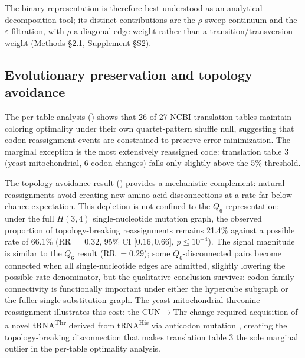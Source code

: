 \documentclass[preprint,11pt,authoryear,a4paper]{elsarticle}
\begin{document}
The binary representation is therefore best understood as an analytical
decomposition tool; its distinct contributions are the \(\rho\)-sweep
continuum and the \(\varepsilon\)-filtration, with \(\rho\) a
diagonal-edge weight rather than a transition/transversion weight
(Methods §2.1, Supplement §S2).

\subsection{Evolutionary preservation and topology
avoidance}\label{sec:disc-evol}

The per-table analysis () shows that 26 of 27 NCBI
translation tables maintain coloring optimality under their own
quartet-pattern shuffle null, suggesting that codon reassignment events
are constrained to preserve error-minimization. The marginal exception
is the most extensively reassigned code: translation table 3 (yeast
mitochondrial, 6 codon changes) falls only slightly above the 5\%
threshold.

The topology avoidance result () provides a mechanistic
complement: natural reassignments avoid creating new amino acid
disconnections at a rate far below chance expectation. This depletion is
not confined to the \(Q_{6}\) representation: under the full \(H(3,4)\)
single-nucleotide mutation graph, the observed proportion of
topology-breaking reassignments remains 21.4\% against a possible rate
of 66.1\% (\(\text{RR } = 0.32\), 95\% CI \(\lbrack 0.16,0.66\rbrack\),
\(p \leq 10^{- 4}\)). The signal magnitude is similar to the \(Q_{6}\)
result (\(\text{RR } = 0.29\)); some \(Q_{6}\)-disconnected pairs become
connected when all single-nucleotide edges are admitted, slightly
lowering the possible-rate denominator, but the qualitative conclusion
survives: codon-family connectivity is functionally important under
either the hypercube subgraph or the fuller single-substitution graph.
The yeast mitochondrial threonine reassignment illustrates this cost:
the CUN\(\rightarrow\)Thr change required acquisition of a novel
tRNA\textsuperscript{Thr} derived from tRNA\textsuperscript{His} via
anticodon mutation \citep{su2011}, creating the topology-breaking
disconnection that makes translation table 3 the sole marginal outlier
in the per-table optimality analysis.
\end{document}
